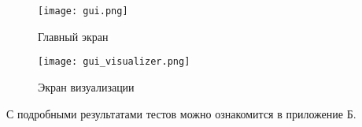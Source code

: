 \begin{figure}[h]
    \centering
    \texttt{[image: gui.png]}
    \caption{Главный экран}
\end{figure}

\begin{figure}[h]
    \centering
    \texttt{[image: gui\_visualizer.png]}
    \caption{Экран визуализации}
\end{figure}

С подробными результатами тестов можно ознакомится в приложение Б.